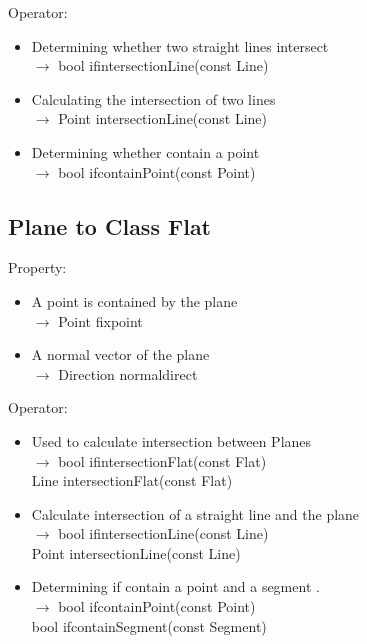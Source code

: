 \documentclass[a4paper]{book}
\numberwithin{equation}{chapter}
\theoremstyle{definition}
\begin{document}
\begin{multicols}{2}
\begin{itemize}
\end{itemize}

Operator:
\begin{itemize}
	\item Determining whether two straight lines intersect \\
	$ \longrightarrow $ bool ifintersectionLine(const Line)
	
	\item Calculating the intersection of two lines \\
	$ \longrightarrow $ Point intersectionLine(const Line)
	
	\item Determining whether contain a point \\
	$ \longrightarrow $ bool ifcontainPoint(const Point)
	
\end{itemize}

\subsection{Plane to Class Flat}

Property:
\begin{itemize}
	\item A point is contained by the plane \\
	$ \longrightarrow $ Point fixpoint 
	
	\item A normal vector of the plane \\
	$ \longrightarrow $ Direction normaldirect
	
\end{itemize}

Operator:
\begin{itemize}
	\item Used to calculate intersection between Planes \\
	$ \longrightarrow $ bool ifintersectionFlat(const Flat)
	\\ Line intersectionFlat(const Flat)
	
	\item Calculate intersection of a straight line and the plane \\
	$ \longrightarrow $ bool ifintersectionLine(const Line) \\ Point intersectionLine(const Line)
	
	\item Determining if contain a point and a segment . \\
	$ \longrightarrow $ bool ifcontainPoint(const Point)
	\\ bool ifcontainSegment(const Segment)
	


\end{itemize}
\end{multicols}
\end{document}
